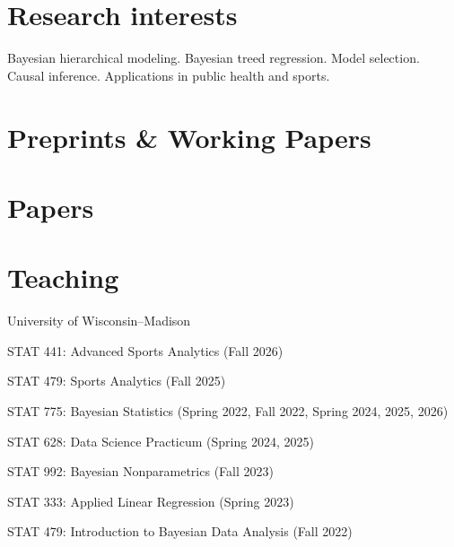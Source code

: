 \documentclass[10pt]{article}
\renewenvironment{itemize}{
  \begin{list}{}{
    \setlength{\leftmargin}{1.5em}
  }
}{
  \end{list}
}
\begin{document}
\section*{Research interests}
\begin{itemize}
\item{Bayesian hierarchical modeling. Bayesian treed regression. Model selection. Causal inference. Applications in public health and sports.}
\end{itemize}

\section*{Preprints \& Working Papers}
\nocite{*}
\uspunctuation
\printbibliography[heading=none]

\section*{Papers}
\nocite{*}
\uspunctuation
\printbibliography[heading=none]

\section*{Teaching}

\begin{itemize}
\item{University of Wisconsin--Madison}
\begin{itemize}
\item{STAT 441: Advanced Sports Analytics (Fall 2026)}
\item{STAT 479: Sports Analytics (Fall 2025)}
\item{STAT 775: Bayesian Statistics (Spring 2022, Fall 2022, Spring 2024, 2025, 2026)}
\item{STAT 628: Data Science Practicum (Spring 2024, 2025)}
\item{STAT 992: Bayesian Nonparametrics (Fall 2023)}
\item{STAT 333: Applied Linear Regression (Spring 2023)}
\item{STAT 479: Introduction to Bayesian Data Analysis (Fall 2022)}
\end{itemize}
\end{itemize}
\end{document}
